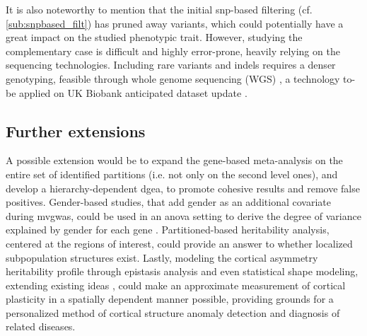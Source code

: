 It is also noteworthy to mention that the initial \ac{snp}-based filtering (cf. \autoref{sub:snpbased_filt}) has pruned away variants, which could potentially have a great impact on the studied phenotypic trait. However, studying the complementary case is difficult and highly error-prone, heavily relying on the sequencing technologies. Including rare variants and indels requires a denser genotyping, feasible through whole genome sequencing (WGS) \cite{Kierczak2022,Cirulli2020}, a technology to-be applied on UK Biobank anticipated dataset update \cite{Halldorsson2022}.


\subsection{Further extensions}
A possible extension would be to expand the gene-based meta-analysis on the entire set of identified partitions (i.e. not only on the second level ones), and develop a hierarchy-dependent \ac{dgea}, to promote cohesive results and remove false positives. Gender-based studies, that add gender as an additional covariate during  \ac{mvgwas}, could be used in an \ac{anova} setting to derive the degree of variance explained by gender for each gene \cite{Rawlik2016}. Partitioned-based heritability analysis, centered at the regions of interest, could provide an answer to whether localized subpopulation structures exist. Lastly, modeling the cortical asymmetry heritability profile through epistasis analysis and even statistical shape modeling, extending existing ideas \cite{Filipe2019,Claes2014,White2020}, could make an approximate measurement of cortical plasticity in a spatially dependent manner possible, providing grounds for a personalized method of cortical structure anomaly detection and diagnosis of related diseases.


